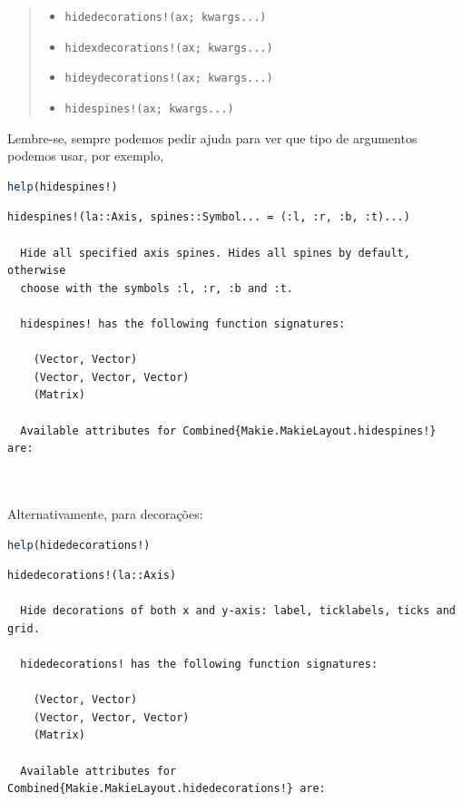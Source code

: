 \documentclass[
  notoc %
]{tufte-book}
\providecommand{\tightlist}{%
  \setlength{\itemsep}{0pt}\setlength{\parskip}{0pt}
}
\newcommand{\passthrough}[1]{#1}
\begin{document}
\begin{quote}
\begin{itemize}
\tightlist
\item
  \passthrough{\lstinline"hidedecorations!(ax; kwargs...)"}
\item
  \passthrough{\lstinline"hidexdecorations!(ax; kwargs...)"}
\item
  \passthrough{\lstinline"hideydecorations!(ax; kwargs...)"}
\item
  \passthrough{\lstinline"hidespines!(ax; kwargs...)"}
\end{itemize}
\end{quote}

Lembre-se, sempre podemos pedir ajuda para ver que tipo de argumentos
podemos usar, por exemplo,

\begin{lstlisting}[language=Julia]
help(hidespines!)
\end{lstlisting}

\begin{lstlisting}[language=Output]
  hidespines!(la::Axis, spines::Symbol... = (:l, :r, :b, :t)...)

  Hide all specified axis spines. Hides all spines by default, otherwise
  choose with the symbols :l, :r, :b and :t.

  hidespines! has the following function signatures:

    (Vector, Vector)
    (Vector, Vector, Vector)
    (Matrix)

  Available attributes for Combined{Makie.MakieLayout.hidespines!} are:

  
\end{lstlisting}

Alternativamente, para decorações:

\begin{lstlisting}[language=Julia]
help(hidedecorations!)
\end{lstlisting}

\begin{lstlisting}[language=Output]
  hidedecorations!(la::Axis)

  Hide decorations of both x and y-axis: label, ticklabels, ticks and grid.

  hidedecorations! has the following function signatures:

    (Vector, Vector)
    (Vector, Vector, Vector)
    (Matrix)

  Available attributes for Combined{Makie.MakieLayout.hidedecorations!} are:

  
\end{lstlisting}
\end{document}
